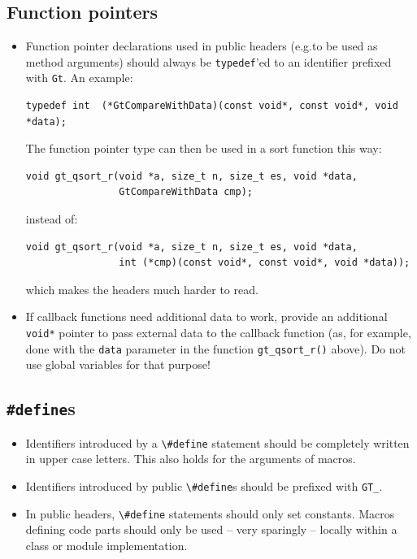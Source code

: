 \documentclass[11pt,final]{article}
\newcommand{\keyword}[1]{\lstinline{#1}}
\begin{document}
\subsection{Function pointers}
\begin{itemize}
\item
Function pointer declarations used in public headers (e.g.\@ to be used as method
arguments) should always be \keyword{typedef}'ed to an identifier prefixed with
\keyword{Gt}. An example:
\begin{lstlisting}
typedef int  (*GtCompareWithData)(const void*, const void*, void *data);
\end{lstlisting}

The function pointer type can then be used in a sort function this way:

\begin{lstlisting}
void gt_qsort_r(void *a, size_t n, size_t es, void *data,
                GtCompareWithData cmp);
\end{lstlisting}

instead of:

\begin{lstlisting}
void gt_qsort_r(void *a, size_t n, size_t es, void *data,
                int (*cmp)(const void*, const void*, void *data));
\end{lstlisting}

which makes the headers much harder to read.
\item
If callback functions need additional data to work, provide an additional
\keyword{void*} pointer to pass external data to the callback function
(as, for example, done with the \keyword{data} parameter in the function
\keyword{gt_qsort_r()} above). Do not use global variables for that purpose!
\end{itemize}

\subsection{\texttt{\#define}s}
\begin{itemize}
\item
Identifiers introduced by a \keyword{\#define} statement should be completely
written in upper case letters. This also holds for the arguments of
macros.
\item
Identifiers introduced by public \keyword{\#define}s should be prefixed with
\keyword{GT_}.
\item
In public headers, \keyword{\#define} statements should only set constants.
Macros defining code parts should only be used -- very sparingly -- locally
within a class or module implementation.
\end{itemize}
\end{document}
